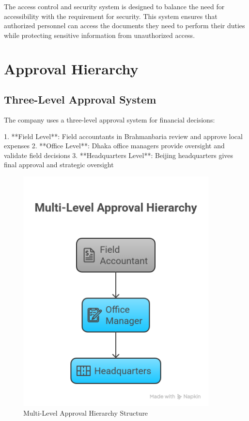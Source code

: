 The access control and security system is designed to balance the need for accessibility with the requirement for security. This system ensures that authorized personnel can access the documents they need to perform their duties while protecting sensitive information from unauthorized access.

\section{Approval Hierarchy}

\subsection{Three-Level Approval System}
The company uses a three-level approval system for financial decisions:

1. **Field Level**: Field accountants in Brahmanbaria review and approve local expenses
2. **Office Level**: Dhaka office managers provide oversight and validate field decisions  
3. **Headquarters Level**: Beijing headquarters gives final approval and strategic oversight

\begin{figure}[H]
    \centering
    \includegraphics[width=0.9\textwidth]{assets/images/approval_hierarchy.png}
    \caption{Multi-Level Approval Hierarchy Structure}
    \label{fig:approval_hierarchy}
\end{figure}


